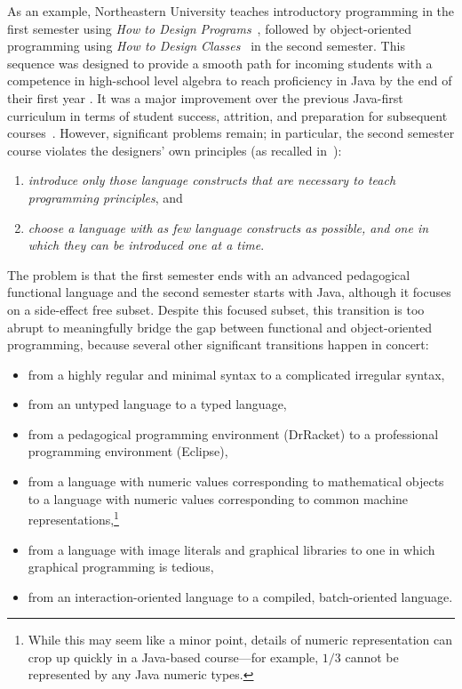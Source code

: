 \documentclass[submission,copyright]{eptcs}
\begin{document}
As an example, Northeastern University teaches introductory programming
in the first semester using \emph{How to Design
  Programs}~\cite{dvanhorn:Felleisen2001How}, followed by
object-oriented programming using \emph{How to Design
  Classes}~\cite{local:htdc} in the second semester.  This sequence
was designed to provide a smooth path for incoming students with
 a competence in high-school level algebra to reach
proficiency in Java by the end of their first year
\cite{dvanhorn:Felleisen2004Structure}.  It was a major improvement
over the previous Java-first curriculum in terms of student success,
attrition, and preparation for subsequent
courses~\cite{dvanhorn:Proulx2006Design}.  However, significant
problems remain; in particular, the second semester course violates
the designers' own principles (as recalled
in~\cite{dvanhorn:Bloch2000Scheme}):
%
\begin{enumerate}
\item \emph{introduce only those language constructs that are necessary to
  teach programming principles}, and
\item \emph{choose a language with as
  few language constructs as possible, and one in which they can be
  introduced one at a time}.
\end{enumerate}

The problem is that the first semester ends with an advanced
pedagogical functional language and the second semester starts with
Java, although it focuses on a side-effect free subset.  Despite this focused
subset, this transition is too abrupt to meaningfully bridge the gap
between functional and object-oriented programming, because
several other significant transitions happen in concert:
\begin{itemize}
\item from a highly regular and minimal syntax to a complicated
  irregular syntax,

\item from an untyped language to a typed language,

\item from a pedagogical programming environment (DrRacket) to a professional
programming environment (Eclipse),

\item from a language with numeric values corresponding to
  mathematical objects to a language with numeric values corresponding
  to common machine representations,\footnote{While this may seem like
    a minor point, details of numeric representation can crop up
    quickly in a Java-based course---for example, $1/3$ cannot be
    represented by any Java numeric types.}

\item from a language with image literals and graphical libraries to
  one in which graphical programming is tedious,

\item from an interaction-oriented language to a compiled,
  batch-oriented language.  
\end{itemize}
\end{document}
